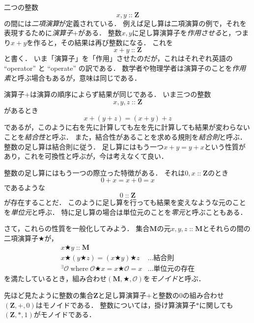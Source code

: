 \documentclass[twocolumn]{jsbook}
\newcommand{\keyword}[1]{\emph{#1}}
\newcommand{\binaryadd}{+}
\newcommand{\istypeof}{\mathop{::}}
\newcommand{\mathbinaryop}{\bigstar}
\newcommand{\mathidentity}{\mathcal{O}}
\newcommand{\mathsetname}[1]{\boldsymbol{#1}}
\newcommand{\mathtriple}[3]{(#1,#2,#3)}
\newcommand{\mathwhere}{\mathop{\text{where}}}
\begin{document}
二つの整数$$x,y\istypeof\mathsetname{Z}$$の間には\keyword{二項演算}が定義されている．
例えば足し算は二項演算の例で，それを表現するために\keyword{演算子}$+$がある．
整数$x,y$に足し算演算子を\keyword{作用させる}と，つまり$x+y$を作ると，その結果は再び整数になる．
これを$$x+y\istypeof\mathsetname{Z}$$と書く．
いま「演算子」を「作用」させたのだが，これはそれぞれ英語の ``operator'' と ``operate'' の訳である．
数学者や物理学者は演算子のことを\keyword{作用素}と呼ぶ場合もあるが，意味は同じである．


演算子$\binaryadd$は演算の順序によらず結果が同じである．
いま三つの整数$$x,y,z\istypeof\mathsetname{Z}$$があるとき$$x+(y+z)=(x+y)+z$$であるが，このように右を先に計算しても左を先に計算しても結果が変わらないことを\keyword{結合性}と呼ぶ．
また，結合性があることを求める規則を\keyword{結合則}と呼ぶ．
整数の足し算は結合則に従う．
足し算にはもう一つ$x+y=y+x$という性質があり，これを可換性と呼ぶが，今は考えなくて良い．

整数の足し算にはもう一つの際立った特徴がある．
それは$0,x\istypeof\mathsetname{Z}$のとき$$0+x=x+0=x$$であるような$$0\istypeof\mathsetname{Z}$$が存在することだ．
このように足し算を行っても結果を変えなような元のことを\keyword{単位元}と呼ぶ．
特に足し算の場合は単位元のことを\keyword{零元}と呼ぶこともある．

さて，これらの性質を一般化してみよう．
集合$\mathsetname{M}$の元$x,y,z\istypeof\mathsetname{M}$とそれらの間の二項演算子$\mathbinaryop$が，
\begin{align}
x\mathbinaryop y\istypeof\mathsetname{M}\\
x\mathbinaryop(y\mathbinaryop z)=(x\mathbinaryop y)\mathbinaryop z&\dots\text{結合則}\\
{}^\exists\mathidentity\mathwhere\mathidentity\mathbinaryop x=x\mathbinaryop\mathidentity=x&\dots\text{単位元の存在}
\end{align}
を満たしているとき，組み合わせ$\mathtriple{\mathsetname{M}}{\mathbinaryop}{\mathidentity}$を\keyword{モノイド}と呼ぶ．

先ほど見たように整数の集合$\mathsetname{Z}$と足し算演算子$+$と整数の$0$の組み合わせ$\mathtriple{\mathsetname{Z}}{+}{0}$はモノイドである．
整数については，掛け算演算子$*$に関しても$\mathtriple{\mathsetname{Z}}{*}{1}$がモノイドである．
\end{document}
